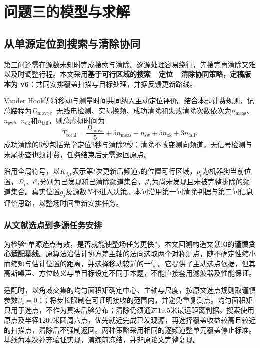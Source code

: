\section{问题三的模型与求解}
\label{sec:q3}

\subsection{从单源定位到搜索与清除协同}

第三问还需在源数未知时完成搜索与清除。逐源处理容易绕行，先搜完再清除又难以及时调整行程。本文采用\textbf{基于可行区域的搜索—定位—清除协同策略，定稿版本为 v6}：共同安排覆盖扫描与目标处理，并据反馈更新路线。

Vander Hook等将移动与测量时间共同纳入主动定位评价\cite{VanderHook2014}。结合本题计费规则，记总路程为$D_{\mathrm{move}}$，无线电检测、实际换频、成功清除和失败清除次数依次为$n_{\mathrm{meas}}$、$n_{\mathrm{sw}}$、$n_{\mathrm{ok}}$和$n_{\mathrm{fail}}$，则总虚拟时间为
\begin{equation}
T_{\mathrm{total}}=\frac{D_{\mathrm{move}}}{5}+5n_{\mathrm{meas}}+n_{\mathrm{sw}}
                     +5n_{\mathrm{ok}}+3n_{\mathrm{fail}}.
\label{eq:q3-cost}
\end{equation}
成功清除的5秒包括光学定位3秒与清除2秒；清除不改变测向频道，无信号检测与末尾排查也须计费，任务结束后无需返回原点。

沿用全局符号，以$K_{j,t}$表示第$t$次更新后频道$j$的位置可行区域，$p_t$为机器狗当前位置，$\mathcal D_t$、$\mathcal C_t$分别为已发现和已清除频道集合，$\mathcal J_t$为尚未发现且未被完整排除的频道集合。真实位置$g_j$及源数$N$不进入决策。本问沿用第一问清除判据与第二问信息评价思路，以整场时间重新安排任务。


\subsubsection{从文献选点到多源任务安排}

为检验“单源选点有效，是否就能使整场任务更快”，本文回溯构造文献03的\textbf{谨慎贪心适配基线}。原算法沿估计协方差主轴的法向选取两个对称测点，随不确定性缩小而缩短与估计位置的距离，并选择移动较近的一侧\cite{VanderHook2014}。它提供了主动选点依据，但其高斯噪声、方位歧义与单目标设定不同于本题，不能直接套用滤波器及性能保证。

适配时，以角域交集的均匀面积矩确定中心、主轴与尺度，按原文选点规则取谨慎参数$\beta_{\mathrm c}=0.1$；将步长限制在可证明接收的范围内，并避免重复测点。均匀面积矩只用于选点，不作为真实后验分布；清除仍须通过19.5米最远距离判据。搜索使用原点及半径1200米圆周六点，优先就近完成已发现源，再选择覆盖收益较高且较近的扫描点，清除后不强制返回。两种策略采用相同的逐频道整单元覆盖停止标准。基线为本次补充验证实现，演练前冻结，并非原论文完整复现。

